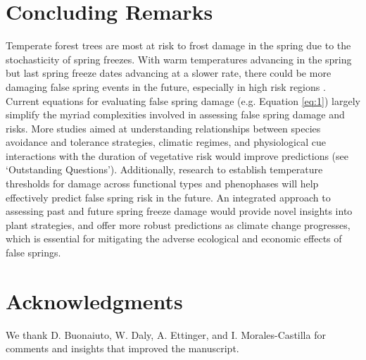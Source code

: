 \documentclass{article}\usepackage[]{graphicx}\usepackage[]{color}
\begin{document}
\section*{Concluding Remarks}
Temperate forest trees are most at risk to frost damage in the spring due to the stochasticity of spring freezes. With warm temperatures advancing in the spring but last spring freeze dates advancing at a slower rate, there could be more damaging false spring events in the future, especially in high risk regions \citep{Gu2008, Inouye2008, Liu2018}. Current equations for evaluating false spring damage (e.g. Equation \ref{eq:1}) largely simplify the myriad complexities involved in assessing false spring damage and risks. More studies aimed at understanding relationships between species avoidance and tolerance strategies, climatic regimes, and physiological cue interactions with the duration of vegetative risk would improve predictions (see `Outstanding Questions'). Additionally, research to establish temperature thresholds for damage across functional types and phenophases will help effectively predict false spring risk in the future. An integrated approach to assessing past and future spring freeze damage would provide novel insights into plant strategies, and offer more robust predictions as climate change progresses, which is essential for mitigating the adverse ecological and economic effects of false springs.

\section*{Acknowledgments}
We thank D. Buonaiuto,  W. Daly, A. Ettinger, and I. Morales-Castilla for comments and insights that improved the manuscript. 

\nocite{Soudani2012}
\nocite{White2009}
\nocite{Schaber2005}
\nocite{Schwartz1993}
\nocite{Barker2005}
\nocite{Sanchez2013}
\nocite{Longstroth2012}
\nocite{Barlow2015}
\nocite{Longstroth2013}
\nocite{Charrier2011}

\end{document}
